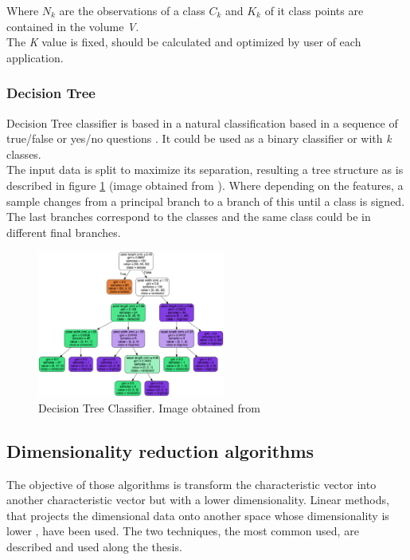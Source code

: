 Where $N_k$ are the observations of a class $C_k$ and $K_k$ of it class points are contained in the volume \textit{V}.\\

The \textit{K} value is fixed, should be calculated and optimized by user of each application.\\

\subsubsection{Decision Tree}
Decision Tree classifier is based in a natural classification based in a sequence of true/false or yes/no questions \cite{Duda}. It could be used as a binary classifier or with \textit{k} classes. \\

The input data is split to maximize its separation, resulting a tree structure \cite{ClassifiersReview} as is described in figure \ref{fig:Tree} (image obtained from \cite{Treeimage}). Where depending on the features, a sample changes from a principal branch to a branch of this until a class is signed. The last branches correspond to the classes and the same class could be in different final branches. \\

\begin{figure}[htb]
\centering
\includegraphics[width=0.55\textwidth]{images_miscelaneus/tree.png}
\caption{Decision Tree Classifier. Image obtained from \cite{Treeimage}} \label{fig:Tree}
\end{figure}

\subsection{Dimensionality reduction algorithms}
The objective of those algorithms is transform the characteristic vector into another characteristic vector but with a lower dimensionality. Linear methods, that projects the dimensional data onto another space whose dimensionality is lower \cite{Duda}, have been used. The two techniques, the most common used, are described and used along the thesis.\\


